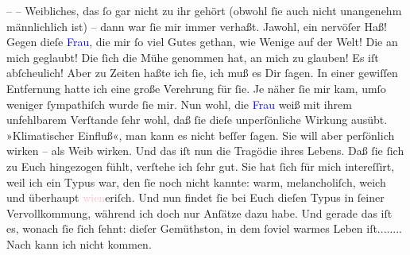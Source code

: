                – \label{K_L02735-2v}\label{K_L02735-2h} – Weibliches, das ſo gar nicht zu ihr gehört (obwohl ſie
               auch nicht unangenehm männlichlich ist) – dann war ſie \strikeout{\textcolor{gray}{den}} mir immer verhaßt. Jawohl, ein nervöſer Haß! Gegen dieſe \textcolor{blue}{Frau}{}, die mir ſo viel Gutes gethan, wie
               Wenige auf  der Welt! Die an mich geglaubt! Die ſich die Mühe genommen hat, an {\pb}mich zu glauben! Es iſt abſcheulich! Aber zu Zeiten
               haßte ich ſie, ich muß es Dir ſagen. In einer gewiſſen Entfernung  hatte ich eine große Verehrung für ſie. Je näher
               ſie mir kam, umſo weniger ſympathiſch wurde ſie mir.\pend
           \pstart
           Nun wohl, die \textcolor{blue}{Frau}{} weiß mit
               ihrem unfehlbarem Verſtande ſehr wohl, daß ſie dieſe unperſönliche Wirkung ausübt.
               »Klimatischer {\pb}Einfluß«, man kann es nicht beſſer
               ſagen. Sie will aber perſönlich wirken – als Weib wirken. Und das iſt nun die
               Tragödie ihres Lebens.\pend
           \pstart
           Daß ſie ſich zu Euch hingezogen fühlt, verſtehe ich ſehr gut. Sie hat ſich für mich
               intereſſirt, weil ich ein Typus war, den ſie noch nicht kannte: warm, melancholiſch,
               weich und  überhaupt \textcolor{pink}{wien}{}\ledrightnote{\textcolor{pink}{Wien}}eriſch. Und nun findet ſie
               bei Euch dieſen {\pb} Typus in ſeiner Vervollkommung, während ich doch
               nur Anſätze dazu habe. Und gerade das iſt es, wonach ſie ſich ſehnt: dieſer
               Gemüthston, in dem ſoviel warmes Leben iſt........\pend
           \pstart
           Nach \label{K_L02735-3v}\label{K_L02735-3h} kann ich nicht kommen.
